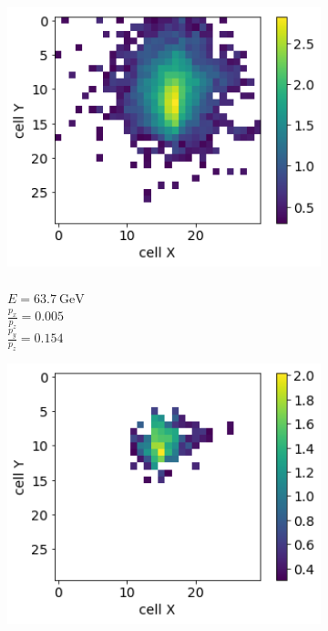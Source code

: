 \begin{figure}
\begin{subfigure}{0.24\textwidth}
  \end{subfigure}\\
   \begin{subfigure}{0.24\textwidth}
    \centering
    \includegraphics[width=1\textwidth]{figures/1_gen.png}
    \caption{\\$E = 63.7~\text{GeV}$ \\ $\frac{p_x}{p_z}=0.005$ \\ $\frac{p_y}{p_z}=0.154$}%
  \end{subfigure}
  \begin{subfigure}{0.24\textwidth}
    \centering
    \includegraphics[width=1\textwidth]{figures/2_gen.png}

\end{subfigure}
\end{figure}
